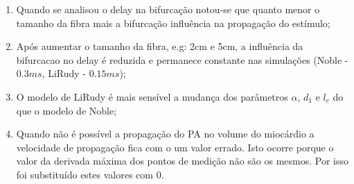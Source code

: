 \documentclass[]{article}
\begin{document}
\begin{enumerate}
		\item Quando se analisou o delay na bifurcação notou-se que quanto menor o tamanho da fibra mais a bifurcação influência na propagação do estímulo;
		
		\item Após aumentar o tamanho da fibra, e.g: 2cm e 5cm, a influência da bifurcacao no delay é reduzida e permanece constante nas simulações (Noble - $0.3 ms$, LiRudy - $0.15 ms$);
		
		\item O modelo de LiRudy é mais sensível a mudança dos parâmetros $\alpha$, $d_1$ e $l_c$ do que o modelo de Noble;
		
		\item Quando não é possível a propagação do PA no volume do miocárdio a velocidade de propagação fica com o um valor errado. Isto ocorre porque o valor da derivada máxima dos pontos de medição não são os mesmos. Por isso foi substituído estes valores com 0.
			
	\end{enumerate}	
\end{document}
